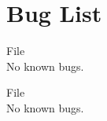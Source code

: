 \chapter{Bug List}
\hypertarget{bug}{}\label{bug}

\begin{DoxyRefList}
\item[File \doxylink{mydll_8c}{mydll.c} ]\hfill \\
\label{bug__bug000001}%
%
No known bugs.  
\item[File \doxylink{mydll_8h}{mydll.h} ]\hfill \\
\label{bug__bug000002}%
%
No known bugs. 
\end{DoxyRefList}